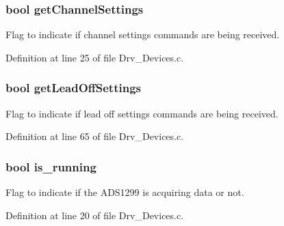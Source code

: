 \subsubsection[{\texorpdfstring{get\+Channel\+Settings}{getChannelSettings}}]{\setlength{\rightskip}{0pt plus 5cm}bool get\+Channel\+Settings}\hypertarget{group__Devices__Library_ga7ef266ee79910e6754e8783b550b4a0a}{}\label{group__Devices__Library_ga7ef266ee79910e6754e8783b550b4a0a}


Flag to indicate if channel settings commands are being received. 



Definition at line 25 of file Drv\+\_\+\+Devices.\+c.

\subsubsection[{\texorpdfstring{get\+Lead\+Off\+Settings}{getLeadOffSettings}}]{\setlength{\rightskip}{0pt plus 5cm}bool get\+Lead\+Off\+Settings}\hypertarget{group__Devices__Library_ga774931d6c0caa199a9884bce2b300439}{}\label{group__Devices__Library_ga774931d6c0caa199a9884bce2b300439}


Flag to indicate if lead off settings commands are being received. 



Definition at line 65 of file Drv\+\_\+\+Devices.\+c.

\subsubsection[{\texorpdfstring{is\+\_\+running}{is_running}}]{\setlength{\rightskip}{0pt plus 5cm}bool is\+\_\+running}\hypertarget{group__Devices__Library_ga95cbd6b99430748422cc048b4f29dc52}{}\label{group__Devices__Library_ga95cbd6b99430748422cc048b4f29dc52}


Flag to indicate if the A\+D\+S1299 is acquiring data or not. 



Definition at line 20 of file Drv\+\_\+\+Devices.\+c.

